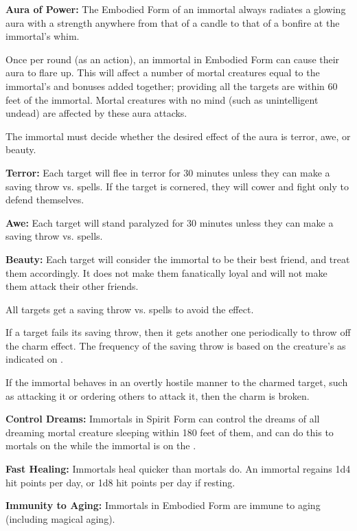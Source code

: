 \begin{multicols*}{2}
\textbf{Aura of Power:} The Embodied Form of an immortal always radiates a glowing aura with a strength anywhere from that of a candle to that of a bonfire at the immortal’s whim.

Once per round (as an action), an immortal in Embodied Form can cause their aura to flare up. This will affect a number of mortal creatures equal to the immortal’s  and  bonuses added together; providing all the targets are within 60 feet of the immortal. Mortal creatures with no mind (such as unintelligent undead) are affected by these aura attacks.

The immortal must decide whether the desired effect of the aura is terror, awe, or beauty.

\textbf{Terror:} Each target will flee in terror for 30 minutes unless they can make a saving throw vs. spells. If the target is cornered, they will cower and fight only to defend themselves.

\textbf{Awe:} Each target will stand paralyzed for 30 minutes unless they can make a saving throw vs. spells.

\textbf{Beauty:} Each target will consider the immortal to be their best friend, and treat them accordingly. It does not make them fanatically loyal and will not make them attack their other friends.

All targets get a saving throw vs. spells to avoid the effect.

If a target fails its saving throw, then it gets another one periodically to throw off the charm effect. The frequency of the saving throw is based on the creature’s  as indicated on .

If the immortal behaves in an overtly hostile manner to the charmed target, such as attacking it or ordering others to attack it, then the charm is broken.

\textbf{Control Dreams:} Immortals in Spirit Form can control the dreams of all dreaming mortal creature sleeping within 180 feet of them, and can do this to mortals on the  while the immortal is on the .

\textbf{Fast Healing:} Immortals heal quicker than mortals do. An immortal regains 1d4 hit points per day, or 1d8 hit points per day if resting.

\textbf{Immunity to Aging:} Immortals in Embodied Form are immune to aging (including magical aging).


\end{multicols*}
